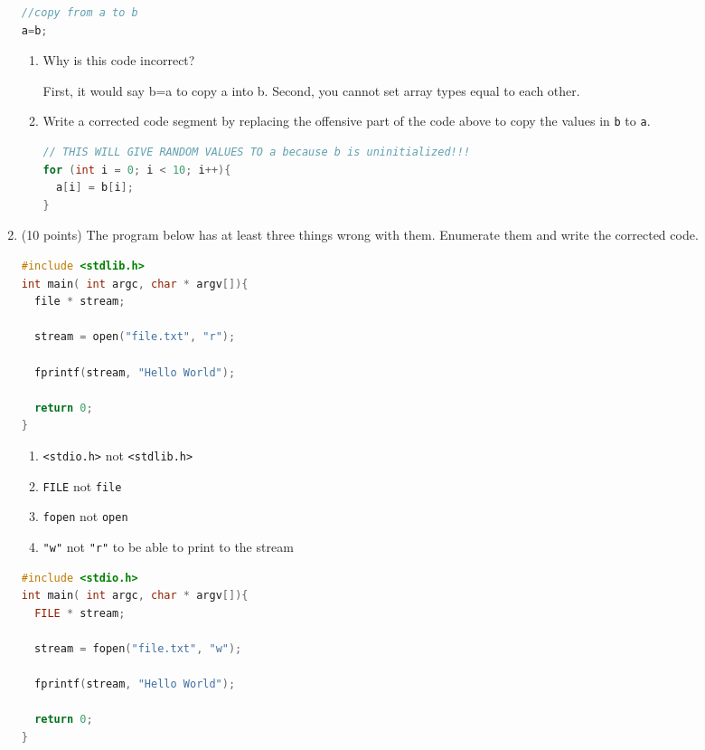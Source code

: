 \documentclass{article}[9pt]
\newenvironment{answerfont}{\fontfamily{qhv}\selectfont}{\par}
\newenvironment{myanswer}{\begin{mdframed}\begin{answerfont}}{\end{answerfont}\end{mdframed}}
\begin{document}
\begin{enumerate}
\begin{lstlisting}[language=c]
//copy from a to b
a=b;
\end{lstlisting}


\begin{enumerate}
\item Why is this code incorrect?


\begin{myanswer}
First, it would say b=a to copy a into b. Second, you cannot set array
types equal to each other.
\end{myanswer}


\item Write a corrected code segment by replacing the offensive part
of the code above to copy the values in \texttt{b} to \texttt{a}.

\begin{myanswer}
\begin{lstlisting}[language=c]
// THIS WILL GIVE RANDOM VALUES TO a because b is uninitialized!!!
for (int i = 0; i < 10; i++){
  a[i] = b[i];
}
\end{lstlisting}
\end{myanswer}

\end{enumerate}

\item (10 points) The program below has at least three things wrong
with them. Enumerate them and write the corrected code.

\begin{lstlisting}[language=c]
#include <stdlib.h>
int main( int argc, char * argv[]){
  file * stream;

  stream = open("file.txt", "r");

  fprintf(stream, "Hello World");

  return 0;
}
\end{lstlisting}

\begin{mdframed}
\begin{enumerate}
  \item \texttt{<stdio.h>} not \texttt{<stdlib.h>}
  \item \texttt{FILE} not \texttt{file}
  \item \texttt{fopen} not \texttt{open}
  \item \texttt{"w"} not \texttt{"r"} to be able to print to the stream
\end{enumerate}

\begin{lstlisting}[language=c]
#include <stdio.h>
int main( int argc, char * argv[]){
  FILE * stream;

  stream = fopen("file.txt", "w");

  fprintf(stream, "Hello World");

  return 0;
}
\end{lstlisting}

\end{mdframed}

\end{enumerate}
\end{document}

